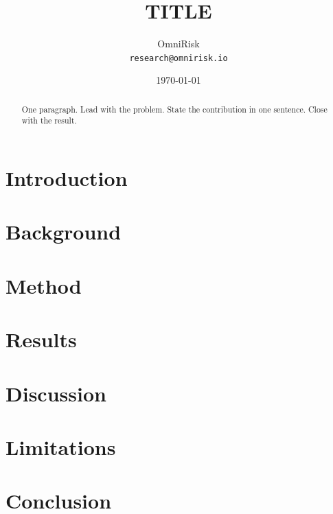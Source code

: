 \documentclass[11pt,a4paper]{article}
\title{TITLE}
\author{OmniRisk \\ \texttt{research@omnirisk.io}}
\date{\today}
\begin{document}
\maketitle

\begin{abstract}
One paragraph. Lead with the problem. State the contribution in one sentence. Close with the result.
\end{abstract}

\section{Introduction}

\section{Background}

\section{Method}

\section{Results}

\section{Discussion}

\section{Limitations}

\section{Conclusion}

\printbibliography
\end{document}
